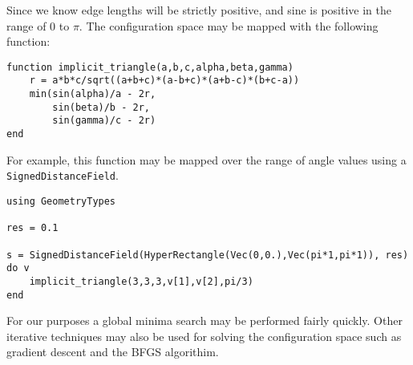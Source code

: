 Since we know edge lengths will be strictly positive, and sine is
positive in the range of 0 to $\pi$. The configuration space
may be mapped with the following function:

\begin{lstlisting}
function implicit_triangle(a,b,c,alpha,beta,gamma)
    r = a*b*c/sqrt((a+b+c)*(a-b+c)*(a+b-c)*(b+c-a))
    min(sin(alpha)/a - 2r,
        sin(beta)/b - 2r,
        sin(gamma)/c - 2r)
end
\end{lstlisting}

For example, this function may be mapped over the range of angle values
using a \texttt{SignedDistanceField}.

\begin{lstlisting}
using GeometryTypes

res = 0.1

s = SignedDistanceField(HyperRectangle(Vec(0,0.),Vec(pi*1,pi*1)), res) do v
    implicit_triangle(3,3,3,v[1],v[2],pi/3)
end
\end{lstlisting}

For our purposes a global minima search may be performed fairly quickly.
Other iterative techniques may also be used for solving the configuration
space such as gradient descent and the BFGS algorithim.




